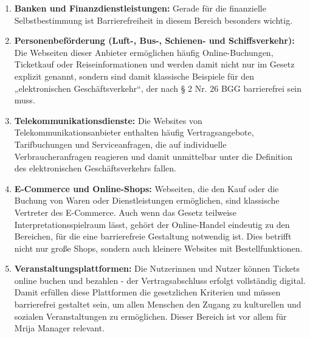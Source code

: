 \begin{enumerate}
    \item \textbf{Banken und Finanzdienstleistungen:} Gerade für die finanzielle Selbstbestimmung ist Barrierefreiheit in diesem Bereich besonders wichtig.

    \item \textbf{Personenbeförderung (Luft-, Bus-, Schienen- und Schiffsverkehr):} Die Webseiten dieser Anbieter ermöglichen häufig Online-Buchungen, Ticketkauf oder Reiseinformationen und werden damit nicht nur im Gesetz explizit genannt, sondern sind damit klassische Beispiele für den „elektronischen Geschäftsverkehr“, der nach § 2 Nr. 26 BGG barrierefrei sein muss.

    \item \textbf{Telekommunikationsdienste:} Die Websites von Telekommunikationsanbieter enthalten häufig Vertragsangebote, Tarifbuchungen und Serviceanfragen, die auf individuelle Verbraucheranfragen reagieren und damit unmittelbar unter die Definition des elektronischen Geschäftsverkehrs fallen.

    \item \textbf{E-Commerce und Online-Shops:} Webseiten, die den Kauf oder die Buchung von Waren oder Dienstleistungen ermöglichen, sind klassische Vertreter des E-Commerce. Auch wenn das Gesetz teilweise Interpretationsspielraum lässt, gehört der Online-Handel eindeutig zu den Bereichen, für die eine barrierefreie Gestaltung notwendig ist. Dies betrifft nicht nur große Shops, sondern auch kleinere Websites mit Bestellfunktionen.

    \item \textbf{Veranstaltungsplattformen:} Die Nutzerinnen und Nutzer können Tickets online buchen und bezahlen - der Vertragsabschluss erfolgt vollständig digital. Damit erfüllen diese Plattformen die gesetzlichen Kriterien und müssen barrierefrei gestaltet sein, um allen Menschen den Zugang zu kulturellen und sozialen Veranstaltungen zu ermöglichen. Dieser Bereich ist vor allem für Mrija Manager relevant.

\end{enumerate}

